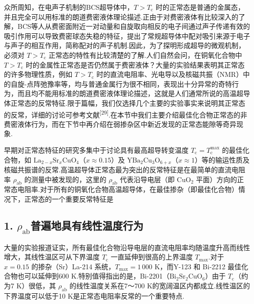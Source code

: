 众所周知，在电声子机制的BCS超导体中，$T>T_{\mathrm{c}}$ 时的正常态是普通的金属态，并且完全可以用标准的朗道费密液体理论描述.正由于对费密液体有比较深入的了解，BCS等人从费密面附近一对动量和自旋取向相反的电子间通过声子传递有效的吸引作用可以导致费密球态失稳的特征，提出了常规超导体中配对吸引来源于电子与声子的相互作用，简称配对的声子机制.因此，为了探明形成超导的微观机制，必须对 $T>T_{\mathrm{c}}$ 正常态的特性有比较清楚的了解.人们自然会问，在铜氧化合物中 $T>T_{\mathrm{c}}$ 时的金属性正常态是否仍然属于费密液体？大量的实验结果表明其正常态的许多物理性质，例如 $T>T_{\mathrm{c}}$ 时的直流电阻率、光电导以及核磁共振（NMR）中的自旋-点阵弛豫率等，均与普通金属行为很不相同，表现出十分异常的奇特行为，而且均不能用标准的朗道费密液体理论描述，这就是人们通常所说的高温超导体正常态的反常特征.限于篇幅，我们仅选择几个主要的实验事实来说明其正常态的反常，详细的讨论可参考文献\textsuperscript{[29]}.在本节中我们主要介绍最佳化合物正常态的非费密液体行为，而在下节中再介绍在弱掺杂区中新近发现的正常态能隙等奇异现象.

早期对正常态特征的研究多集中于讨论具有最高超导转变温度 $T_{\mathrm{c}}=T_{\mathrm{c}}^{\mathrm{max}}$ 的最佳化合物，如 $\mathrm{La}_{2-x}\mathrm{Sr}_{x}\mathrm{CuO}_{4}$（$x\approx0.15$）及 $\mathrm{YBa}_{2}\mathrm{Cu}_{3}\mathrm{O}_{6+x}$（$x\approx1$）等的输运性质及核磁共振谱的反常.高温超导体正常态最为突出的反常特征是在最简单的直流电阻率 $\rho_{\mathrm{ab}}$ 的测量中被发现的，这里的 $\rho_{\mathrm{ab}}$ 代表沿导电层（即 $\mathrm{CuO}_{2}$ 平面）方向的正常态电阻率.对于所有的铜氧化合物高温超导体，在最佳掺杂（即最佳化合物）情况下，正常态的一个重要反常特征是

\subsection*{1. $\rho_{\mathrm{ab}}$普遍地具有线性温度行为}

大量的实验报道证实，所有最佳化合物沿导电层的直流电阻率均随温度升高而线性增大，其线性温区可从下界温度 $T_{\mathrm{c}}$ 一直延伸到很高的上界温度 $T_{\mathrm{max}}$.对于 $x=0.15$ 的掺杂（Sr）La-214 系统，$T_{\mathrm{max}}=1\,000$ K，而Y-123 和 Bi-2212 最佳化合物也可以延伸到600 K.特别值得指出的是，Bi-2201（$\mathrm{Bi}_{2}\mathrm{Sr}_{2}\mathrm{CuO}_{6}$）由于 $T_{\mathrm{c}}$（约为7 K）很低，其 $\rho_{\mathrm{ab}}$ 的线性温度关系在7～700 K的宽阔温区内都成立.线性温区的下界温度可以低于10 K是正常态电阻率反常的一个重要特点.

